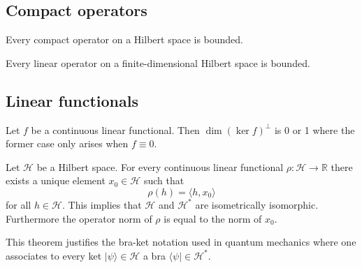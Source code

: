 \subsection{Compact operators}

	
	\begin{property}
		Every compact operator on a Hilbert space is bounded.
	\end{property}
	\begin{result}
		Every linear operator on a finite-dimensional Hilbert space is bounded.
	\end{result}

\subsection{Linear functionals}

	\begin{property}
		Let $f$ be a continuous linear functional. Then $\dim(\ker f)^\perp$ is 0 or 1 where the former case only arises when $f\equiv0$.
	\end{property}

	\begin{theorem}
    		Let $\mathcal{H}$ be a Hilbert space. For every continuous linear functional $\rho:\mathcal{H}\rightarrow\mathbb{R}$ there exists a unique element $x_0\in\mathcal{H}$ such that
    		\begin{equation}
	    		\rho(h) = \langle h, x_0 \rangle
    		\end{equation}
	    	for all $h\in\mathcal{H}$. This implies that $\mathcal{H}$ and $\mathcal{H}^*$ are isometrically isomorphic. Furthermore the operator norm of $\rho$ is equal to the norm of $x_0$.
	\end{theorem}
	\begin{remark}
    		This theorem justifies the bra-ket notation used in quantum mechanics where one associates to every ket $|\psi\rangle\in\mathcal{H}$ a bra $\langle\psi|\in\mathcal{H}^*$.
	\end{remark}
